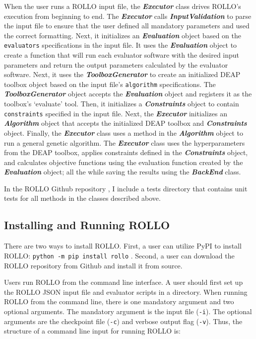 When the user runs a \gls{ROLLO} input file, the \textbf{\textit{Executor}} class 
drives \gls{ROLLO}'s execution from beginning to end.
The \textbf{\textit{Executor}} calls \textbf{\textit{InputValidation}} to 
parse the input file to ensure that the user defined all mandatory parameters
and used the correct formatting.
Next, it initializes an \textbf{\textit{Evaluation}} object based on the 
\texttt{evaluators} specifications in the input file. 
It uses the \textbf{\textit{Evaluation}} object to create a function that will 
run each evaluator software with the desired input parameters and return the 
output parameters calculated by the evaluator software. 
Next, it uses the \textbf{\textit{ToolboxGenerator}} to create an initialized 
DEAP toolbox object based on the input file's \texttt{algorithm} specifications. 
The \textbf{\textit{ToolboxGenerator}} object accepts the 
\textbf{\textit{Evaluation}} object and registers it as the toolbox's `evaluate' 
tool.  
Then, it initializes a \textbf{\textit{Constraints}} object to contain 
\texttt{constraints} specified in the input file. 
Next, the \textbf{\textit{Executor}} initializes an \textbf{\textit{Algorithm}} 
object that accepts the initialized \gls{DEAP} toolbox and \textbf{\textit{Constraints}} 
object. 
Finally, the \textbf{\textit{Executor}} class uses a method in the 
\textbf{\textit{Algorithm}} object to run a general genetic algorithm. 
The \textbf{\textit{Executor}} class uses the hyperparameters from the \gls{DEAP} 
toolbox, applies constraints defined in the \textbf{\textit{Constraints}} object, 
and calculates objective functions using the evaluation function created by the 
\textbf{\textit{Evaluation}} object; all the while saving the results using the 
\textbf{\textit{BackEnd}} class. 

In the \gls{ROLLO} Github repository \cite{chee_rollo_2021}, I include a tests 
directory that contains unit tests for all methods in the classes described 
above. %

\subsection{Installing and Running ROLLO}
There are two ways to install \gls{ROLLO}.
First, a user can utilize \gls{PyPI} to install \gls{ROLLO}: \texttt{python -m 
pip install rollo}
\cite{chee_rollo_2021}.
Second, a user can download the \gls{ROLLO} repository \cite{chee_rollo_2021}
from Github and install it from source. 

Users run \gls{ROLLO} from the command line interface. 
A user should first set up the \gls{ROLLO} JSON input file and evaluator 
scripts in a directory. 
When running \gls{ROLLO} from the command line, there is one mandatory argument and 
two optional arguments. 
The mandatory argument is the input file (\texttt{-i}). 
The optional arguments are the checkpoint file (\texttt{-c}) and verbose 
output flag (\texttt{-v}).  
Thus, the structure of a command line input for running \gls{ROLLO} is: 

